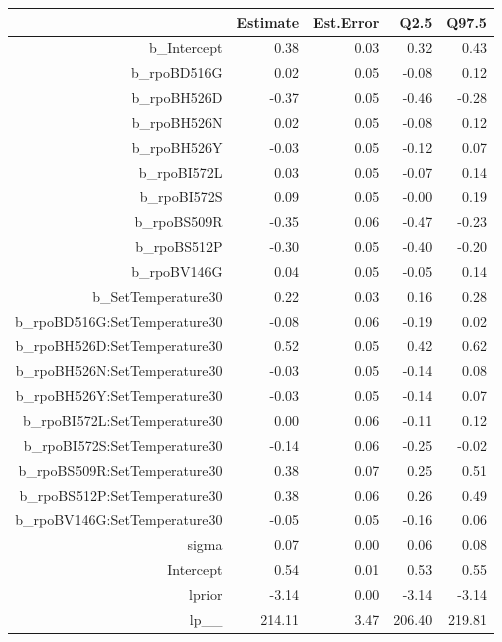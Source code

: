 \begin{table}[ht]
\centering
\begin{tabular}{rrrrr}
  \hline
 & Estimate & Est.Error & Q2.5 & Q97.5 \\ 
  \hline
b\_Intercept & 0.38 & 0.03 & 0.32 & 0.43 \\ 
  b\_rpoBD516G & 0.02 & 0.05 & -0.08 & 0.12 \\ 
  b\_rpoBH526D & -0.37 & 0.05 & -0.46 & -0.28 \\ 
  b\_rpoBH526N & 0.02 & 0.05 & -0.08 & 0.12 \\ 
  b\_rpoBH526Y & -0.03 & 0.05 & -0.12 & 0.07 \\ 
  b\_rpoBI572L & 0.03 & 0.05 & -0.07 & 0.14 \\ 
  b\_rpoBI572S & 0.09 & 0.05 & -0.00 & 0.19 \\ 
  b\_rpoBS509R & -0.35 & 0.06 & -0.47 & -0.23 \\ 
  b\_rpoBS512P & -0.30 & 0.05 & -0.40 & -0.20 \\ 
  b\_rpoBV146G & 0.04 & 0.05 & -0.05 & 0.14 \\ 
  b\_SetTemperature30 & 0.22 & 0.03 & 0.16 & 0.28 \\ 
  b\_rpoBD516G:SetTemperature30 & -0.08 & 0.06 & -0.19 & 0.02 \\ 
  b\_rpoBH526D:SetTemperature30 & 0.52 & 0.05 & 0.42 & 0.62 \\ 
  b\_rpoBH526N:SetTemperature30 & -0.03 & 0.05 & -0.14 & 0.08 \\ 
  b\_rpoBH526Y:SetTemperature30 & -0.03 & 0.05 & -0.14 & 0.07 \\ 
  b\_rpoBI572L:SetTemperature30 & 0.00 & 0.06 & -0.11 & 0.12 \\ 
  b\_rpoBI572S:SetTemperature30 & -0.14 & 0.06 & -0.25 & -0.02 \\ 
  b\_rpoBS509R:SetTemperature30 & 0.38 & 0.07 & 0.25 & 0.51 \\ 
  b\_rpoBS512P:SetTemperature30 & 0.38 & 0.06 & 0.26 & 0.49 \\ 
  b\_rpoBV146G:SetTemperature30 & -0.05 & 0.05 & -0.16 & 0.06 \\ 
  sigma & 0.07 & 0.00 & 0.06 & 0.08 \\ 
  Intercept & 0.54 & 0.01 & 0.53 & 0.55 \\ 
  lprior & -3.14 & 0.00 & -3.14 & -3.14 \\ 
  lp\_\_ & 214.11 & 3.47 & 206.40 & 219.81 \\ 
   \hline
\end{tabular}
\end{table}
